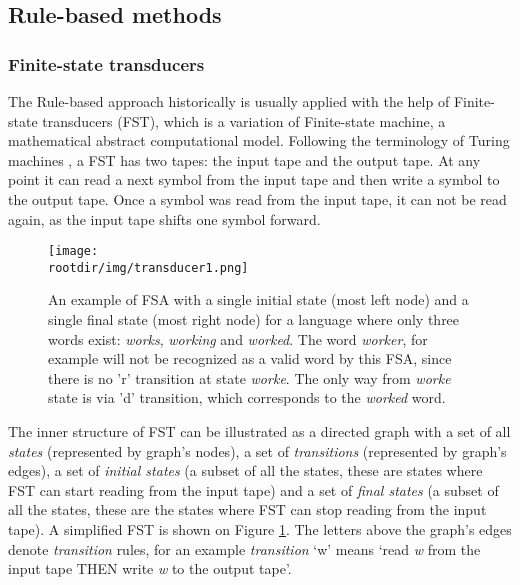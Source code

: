 \subsection{Rule-based methods}
\subsubsection{Finite-state transducers}
The Rule-based approach historically is usually applied with the help of Finite-state transducers (FST), which is a variation of Finite-state machine, a mathematical abstract computational model. Following the terminology of Turing machines \parencite{Turing_1937}, a FST has two tapes: the input tape and the output tape. At any point it can read a next symbol from the input tape and then write a symbol to the output tape. Once a symbol was read from the input tape, it can not be read again, as the input tape shifts one symbol forward. 

\begin{figure}[!h]
    \centering
    \texttt{[image: \\rootdir/img/transducer1.png]}
    \caption{An example of FSA with a single initial state (most left node) and a single final state (most right node) for a language where only three words exist: \textit{works}, \textit{working} and \textit{worked}. The word \textit{worker}, for example will not be recognized as a valid word by this FSA, since there is no 'r' transition at state \textit{worke}. The only way from \textit{worke} state is via 'd' transition, which corresponds to the \textit{worked} word. \parencite{beesley_fst_2002}}
    \label{fig:fst1}
\end{figure}

The inner structure of FST can be illustrated as a directed graph with a set of all \textit{states} (represented by graph's nodes), a set of \textit{transitions} (represented by graph's edges), a set of \textit{initial states} (a subset of all the states, these are states where FST can start reading from the input tape) and a set of \textit{final states} (a subset of all the states, these are the states where FST can stop reading from the input tape). A simplified FST is shown on Figure \ref{fig:fst1}. The letters above the graph's edges denote \textit{transition} rules, for an example \textit{transition} `w' means `read \textit{w} from the input tape THEN write \textit{w} to the output tape'.


